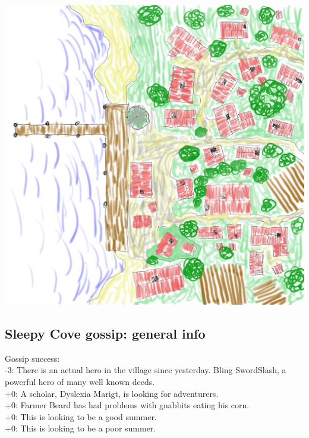 \documentclass[11pt, twoside, titlepage, a4paper]{report}
\begin{document}
\begin{center}
\includegraphics[width=1.0\linewidth]{./maps/Sleepy-Cove-(100x100,16+0+0).jpg}
\end{center}


\subsection*{Sleepy Cove gossip: general info}
Gossip success:\\
-3: There is an actual hero in the village since yesterday. Bling SwordSlash, a powerful hero of many well known deeds.  \\
+0: A scholar, Dyslexia Marigt, is looking for adventurers. \\
+0: Farmer Beard has had problems with gnabbits eating his corn. \\
+0: This is looking to be a good summer. \\
+0: This is looking to be a poor summer. \\
\end{document}
